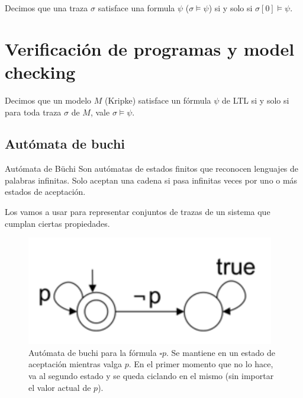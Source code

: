 Decimos que una traza $\sigma$ satisface una formula $\psi$ ($\sigma\vDash\psi$) si y solo si $\sigma[0] \vDash \psi$.


\newpage
\section{Verificación de programas y model checking}
Decimos que un modelo $M$ (Kripke) satisface un fórmula $\psi$ de LTL si y solo si para toda traza $\sigma$ de $M$, vale $\sigma\vDash\psi$.

\subsection{Autómata de buchi}
\begin{definicion}{Autómata de Büchi}
Son autómatas de estados finitos que reconocen lenguajes de palabras infinitas. Solo aceptan una cadena si pasa infinitas veces por uno o más estados de aceptación.

Los vamos a usar para representar conjuntos de trazas de un sistema que cumplan ciertas propiedades. 
\end{definicion}

\begin{figure}[h]
\centering
	\includegraphics[scale=0.5]{imagenes/buchi-siempre-p}
	\caption{Autómata de buchi para la fórmula $\square p$. Se mantiene en un estado de aceptación mientras valga $p$. En el primer momento que no lo hace, va al segundo estado y se queda ciclando en el mismo (sin importar el valor actual de $p$).}
\end{figure}


